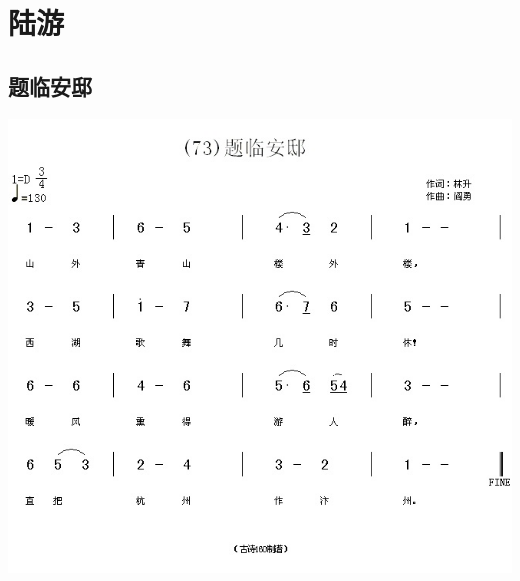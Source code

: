 \documentclass[cn,pad,chinesefont=nofont,twocol]{elegantbook}
\begin{document}
      
\chapter{陆游}
\section{题临安邸}
    \includegraphics[width=\textwidth]{dongxiao/20200808-题临安邸-陆游.jpg}
\end{document}
